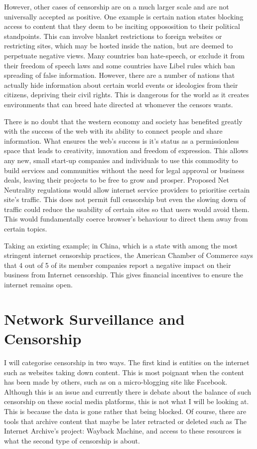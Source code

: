 \documentclass[10pt,a4paper]{article}
\begin{document}
However, other cases of censorship are on a much larger scale and are not universally accepted as positive. One example is certain nation states blocking access to content that they deem to be inciting oppososition to their political standpoints. This can involve blanket restrictions to foreign websites or restricting sites, which may be hosted inside the nation, but are deemed to perpetuate negative views. Many countries ban hate-speech, or exclude it from their freedom of speech laws\cite{hate} and some countries have Libel rules\cite{libel} which ban spreading of false information. However, there are a number of nations that actually hide information about certain world events or ideologies from their citizens, depriving their civil rights\cite{chincensor}. This is dangerous for the world as it creates environments that can breed hate directed at whomever the censors wants.

There is no doubt that the western economy and society has benefited greatly with the success of the web with its ability to connect people and share information. What ensures the web's success is it's status as a permissionless space that leads to creativity, innovation and freedom of expression. This allows any new, small start-up companies and individuals to use this commodity to build services and communities without the need for legal approval or business deals, leaving their projects to be free to grow and prosper. Proposed Net Neutrality regulations would allow internet service providers to prioritise certain site's traffic. This does not permit full censorship but even the slowing down of traffic could reduce the usability of certain sites so that users would avoid them. This would fundamentally coerce browser's behaviour to direct them away from certain topics.

Taking an existing example; in China, which is a state with among the most stringent internet censorship practices, the American Chamber of Commerce\cite{amcham} says that 4 out of 5 of its member companies report a negative impact on their business from Internet censorship. This gives financial incentives to ensure the internet remains open.

\section{Network Surveillance and Censorship}

I will categorise censorship in two ways. The first kind is entities on the internet such as websites taking down content. This is most poignant when the content has been made by others, such as on a micro-blogging site like Facebook. Although this is an issue and currently there is debate about the balance of such censorship on these social media platforms, this is not what I will be looking at. This is because the data is gone rather that being blocked. Of course, there are tools that archive content that maybe be later retracted or deleted such as The Internet Archive's project: Wayback Machine\cite{wb}, and access to these resources is what the second type of censorship is about.
\end{document}
